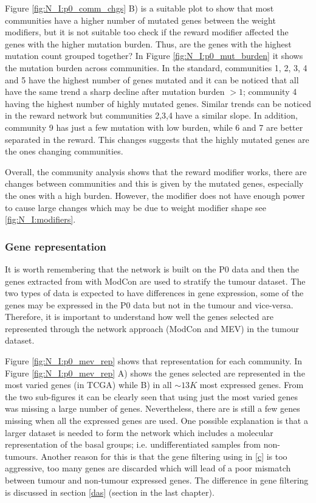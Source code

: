 {%
Figure \ref{fig:N_I:p0_comm_chgs} B) is a suitable plot to show that most communities have a higher number of mutated genes between the weight modifiers, but it is not suitable too check if the reward modifier affected the genes with the higher mutation burden. Thus, are the genes with the highest mutation count grouped together? In Figure \ref{fig:N_I:p0_mut_burden} it shows the mutation burden across communities. In the standard, communities 1, 2, 3, 4 and 5 have the highest number of genes mutated and it can be noticed that all have the same trend a sharp decline after mutation burden $>1$; community 4 having the highest number of highly mutated genes. Similar trends can be noticed in the reward network but communities 2,3,4 have a similar slope. In addition, community 9 has just a few mutation with low burden, while 6 and 7 are better separated in the reward. This changes suggests that the highly mutated genes are the ones changing communities.


Overall, the community analysis shows that the reward modifier works, there are changes between communities and this is given by the mutated genes, especially the ones with a high burden. However, the modifier does not have enough power to cause large changes which may be due to weight modifier shape see \cref{fig:N_I:modifiers}.

\subsubsection{Gene representation}

It is worth remembering that the network is built on the P0 data and then the genes extracted from with ModCon are used to stratify the tumour dataset. The two types of data is expected to have differences in gene expression, some of the genes may be expressed in the P0 data but not in the tumour and vice-versa. Therefore, it is important to understand how well the genes selected are represented through the network approach (ModCon and MEV) in the tumour dataset. 


Figure \ref{fig:N_I:p0_mev_rep} shows that representation for each community. In Figure \ref{fig:N_I:p0_mev_rep} A) shows the genes selected are represented in the most varied genes (in TCGA) while B) in all $\sim13K$ most expressed genes. From the two sub-figures it can be clearly seen that using just the most varied genes was missing a large number of genes. Nevertheless, there are is still a few genes missing when all the expressed genes are used. One possible explanation is that a larger dataset is needed to form the network which includes a molecular representation of the basal groups; i.e. undifferentiated samples from non-tumours. Another reason for this is that the gene filtering using in \cref{c} is too aggressive, too many genes are discarded which will lead of a poor mismatch between tumour and non-tumour expressed genes. The difference in gene filtering is discussed in section \cref{das} (section in the last chapter).

}
